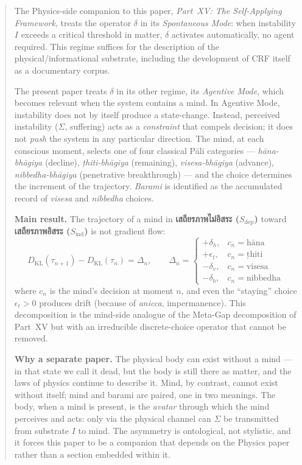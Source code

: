 \documentclass[12pt, a4paper]{article}
\begin{document}
\begin{abstract}
\sloppy
The Physics-side companion to this paper, \emph{Part~XV: The
Self-Applying Framework}, treats the operator $\delta$ in its
\emph{Spontaneous Mode}: when instability $I$ exceeds a critical
threshold in matter, $\delta$ activates automatically, no agent
required. This regime suffices for the description of the
physical/informational substrate, including the development of CRF
itself as a documentary corpus.

The present paper treats $\delta$ in its other regime, its
\emph{Agentive Mode}, which becomes relevant when the system contains
a mind. In Agentive Mode, instability does not by itself produce a
state-change. Instead, perceived instability ($\Sigma$, suffering)
acts as a \emph{constraint} that compels decision; it does not
\emph{push} the system in any particular direction. The mind, at each
conscious moment, selects one of four classical Pāli categories ---
\emph{hāna-bhāgiya} (decline), \emph{ṭhiti-bhāgiya} (remaining),
\emph{visesa-bhāgiya} (advance), \emph{nibbedha-bhāgiya} (penetrative
breakthrough) --- and the choice determines the increment of the
trajectory. \emph{Barami} is identified as the accumulated record of
\emph{visesa} and \emph{nibbedha} choices.

\textbf{Main result.} The trajectory of a mind in
\textbf{เสถียรภาพไม่อิสระ ($S_{\mathrm{dep}}$)} toward
\textbf{เสถียรภาพอิสระ ($S_{\mathrm{ind}}$)} is not gradient flow:
\[
  D_{\mathrm{KL}}(\tau_{n+1}) - D_{\mathrm{KL}}(\tau_n) = \Delta_n,
  \qquad
  \Delta_n =
  \begin{cases}
    +\delta_h, & c_n = \text{hāna} \\
    +\epsilon_t, & c_n = \text{ṭhiti} \\
    -\delta_v, & c_n = \text{visesa} \\
    -\delta_b, & c_n = \text{nibbedha}
  \end{cases}
\]
where $c_n$ is the mind's decision at moment $n$, and even the
``staying'' choice $\epsilon_t > 0$ produces drift (because of
\emph{anicca}, impermanence). This decomposition is the
mind-side analogue of the Meta-Gap decomposition of Part~XV but with
an irreducible discrete-choice operator that cannot be removed.

\textbf{Why a separate paper.} The physical body can exist without a
mind --- in that state we call it dead, but the body is still there
as matter, and the laws of physics continue to describe it. Mind, by
contrast, cannot exist without itself; mind and barami are paired,
one in two meanings. The body, when a mind is present, is the
\emph{avatar} through which the mind perceives and acts: only via the
physical channel can $\Sigma$ be transmitted from substrate $I$ to
mind. The asymmetry is ontological, not stylistic, and it forces this
paper to be a companion that depends on the Physics paper rather
than a section embedded within it.


\end{abstract}
\end{document}
